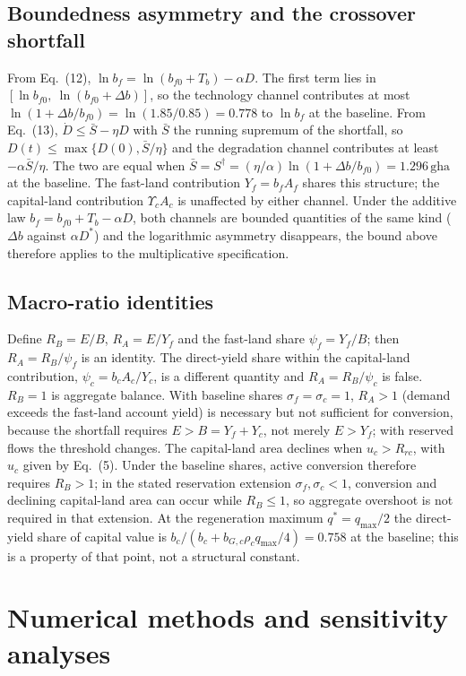 \documentclass[11pt,a4paper]{article}
\newcommand{\Ups}{\Upsilon_c}
\begin{document}
\subsection{Boundedness asymmetry and the crossover shortfall}\label{si:bounded}

From Eq.~(12), $\ln b_f=\ln(b_{f0}+T_b)-\alpha D$. The first term lies in $[\ln b_{f0},\ \ln(b_{f0}+\Delta b)]$, so the technology channel contributes at most $\ln(1+\Delta b/b_{f0})=\ln(1.85/0.85)=0.778$ to $\ln b_f$ at the baseline. From Eq.~(13), $\dot D\le\bar S-\eta D$ with $\bar S$ the running supremum of the shortfall, so $D(t)\le\max\{D(0),\bar S/\eta\}$ and the degradation channel contributes at least $-\alpha\bar S/\eta$. The two are equal when $\bar S=S^\dagger=(\eta/\alpha)\ln(1+\Delta b/b_{f0})=1.296\,\mathrm{gha}$ at the baseline. The fast-land contribution $Y_f=b_fA_f$ shares this structure; the capital-land contribution $\Ups A_c$ is unaffected by either channel. Under the additive law $b_f=b_{f0}+T_b-\alpha D$, both channels are bounded quantities of the same kind ($\Delta b$ against $\alpha D^*$) and the logarithmic asymmetry disappears, the bound above therefore applies to the multiplicative specification.

\subsection{Macro-ratio identities}\label{si:ratios}

Define $R_B=E/B$, $R_A=E/Y_f$ and the fast-land share $\psi_f=Y_f/B$; then $R_A=R_B/\psi_f$ is an identity. The direct-yield share within the capital-land contribution, $\psi_c=b_cA_c/Y_c$, is a different quantity and $R_A=R_B/\psi_c$ is false. $R_B=1$ is aggregate balance. With baseline shares $\sigma_f=\sigma_c=1$, $R_A>1$ (demand exceeds the fast-land account yield) is necessary but not sufficient for conversion, because the shortfall requires $E>B=Y_f+Y_c$, not merely $E>Y_f$; with reserved flows the threshold changes. The capital-land area declines when $u_c>R_{rc}$, with $u_c$ given by Eq.~(5). Under the baseline shares, active conversion therefore requires $R_B>1$; in the stated reservation extension $\sigma_f,\sigma_c<1$, conversion and declining capital-land area can occur while $R_B\le1$, so aggregate overshoot is not required in that extension. At the regeneration maximum $q^*=q_{\max}/2$ the direct-yield share of capital value is $b_c/(b_c+b_{G,c}\rho_cq_{\max}/4)=0.758$ at the baseline; this is a property of that point, not a structural constant.
\section{Numerical methods and sensitivity analyses}\label{si:numerics}
\end{document}
